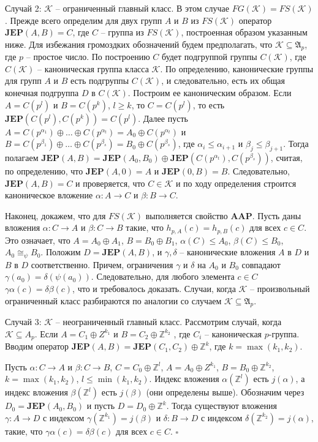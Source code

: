 \documentclass[12pt]{extarticle} %
\def\A{{\mathfrak{A}}}
\def\K{{\mathcal{K}}}
\def\Z{{\mathbb{Z}}}
\def\JEP{\textbf{JEP}}
\def\AAP{\textbf{AAP}}
\begin{document}
Случай 2: $\K$ -- ограниченный главный класс. В этом случае $FG(\K) = FS(\K)$. Прежде всего определим для двух групп $A$ и $B$ из $FS(\K)$ оператор $\JEP(A,B) = C$, где $C$ -- группа из $FS(\K)$, построенная образом указанным ниже. Для избежания громоздких обозначений будем предполагать, что $\K \subseteq \A_p$, где $p$ -- простое число. По построению $C$ будет подгруппой группы $C(\K)$, где $C(\K)$ -- каноническая группа класса $\K$. По определению, канонические группы для групп $A$ и $B$ есть подгруппы $C(\K)$, и следовательно, есть их общая конечная подгруппа $D$ в $C(\K)$. Построим ее каноническим образом. Если $A = C(p^l)$ и $B = C(p^k)$, $l \geq k$, то $C = C(p^l)$, то есть $\JEP(C(p^l), C(p^k)) = C(p^l)$. Далее пусть $A = C(p^{\alpha_1}) \oplus \ldots \oplus C(p^{\alpha_t}) = A_0 \oplus C(p^{\alpha_t})$ и $B = C(p^{\beta_1}) \oplus \ldots \oplus C(p^{\beta_s}) = B_0 \oplus C(p^{\beta_s})$, где $\alpha_i \leq \alpha_{i+1}$ и $\beta_j \leq \beta_{j+1}$. Тогда полагаем $\JEP(A, B) = \JEP(A_0, B_0) \oplus \JEP(C(p^{\alpha_t}), C(p^{\beta_s}))$, считая, по определению, что $\JEP(A, 0) = A$ и $\JEP(0, B) = B$. Следовательно, $\JEP(A,B) = C$ и проверяется, что $C \in \K$ и по ходу определения строится каноническое вложение $\alpha: A \rightarrow C$ и $\beta: B \rightarrow C$.

Наконец, докажем, что для $FS(\K)$ выполняется свойство $\AAP$. Пусть даны вложения $\alpha: C \rightarrow A$ и $\beta: C \rightarrow B$ такие, что $h_{p,A}(c) = h_{p,B}(c)$ для всех $c \in C$. Это означает, что $A = A_0 \oplus A_1$, $B = B_0 \oplus B_1$, $\alpha(C) \leq A_0$, $\beta(C) \leq B_0$, $A_0 \cong_\psi B_0$. Положим $D = \JEP(A, B)$, и $\gamma, \delta$ -- канонические вложения $A$ в $D$ и $B$ в $D$ соответственно. Причем, ограничения $\gamma$ и $\delta$ на $A_0$ и $B_0$ совпадают $\gamma(a_0) = \delta(\psi(a_0))$. Следовательно, для любого элемента $c \in C$ $\gamma \alpha(c) = \delta \beta(c)$, что и требовалось доказать. Случаи, когда $\K$ -- произвольный ограниченный класс разбираются по аналогии со случаем $\K \subseteq \A_p$.

Случай 3: $\K$ -- неограниченный главный класс. Рассмотрим случай, когда $\K \subseteq A_p$. Если $A = C_1 \oplus Z^{k_1}$ и $B = C_2 \oplus \Z^{k_2}$ , где $C_i$ -- каноническая $p$-группа. Вводим оператор $\JEP(A, B) = \JEP(C_1, C_2) \oplus \Z^k$, где $k = \max(k_1, k_2)$.

Пусть $\alpha: C \rightarrow A$ и $\beta: C \rightarrow B$, $C = C_0 \oplus \Z^l$, $A = A_0 \oplus Z^{k_1}$, $B = B_0 \oplus \Z^{k_2}$, $k = \max(k_1, k_2)$, $l \leq \min(k_1, k_2)$. Индекс вложения $\alpha(\Z^l)$ есть $j(\alpha)$, а индекс вложения $\beta(\Z^l)$ есть $j(\beta)$ (они определены выше). Обозначим через $D_0 = \JEP(A_0, B_0)$ и пусть $D = D_0 \oplus \Z^k$. Тогда существуют вложения $\gamma: A \rightarrow D$ с индексом $\gamma(\Z^{k_1}) = j(\beta)$ и $\delta: B \rightarrow D$ с индексом $\delta(\Z^{k_2}) = j(\alpha)$, такие, что $\gamma\alpha(c) = \delta\beta(c)$ для всех $c \in C$. $\square$
\end{document}
